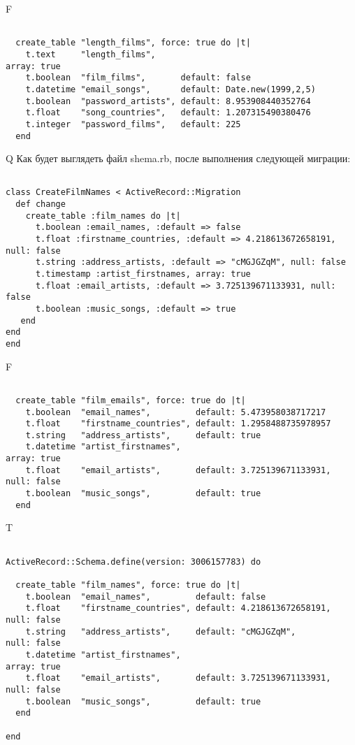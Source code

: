 F
\begin{verbatim}

  create_table "length_films", force: true do |t|
    t.text     "length_films",                                     array: true
    t.boolean  "film_films",       default: false
    t.datetime "email_songs",      default: Date.new(1999,2,5)
    t.boolean  "password_artists", default: 8.953908440352764
    t.float    "song_countries",   default: 1.207315490380476
    t.integer  "password_films",   default: 225
  end

\end{verbatim}

Q
Как будет выглядеть файл shema.rb, после выполнения следующей миграции:

\begin{verbatim}

class CreateFilmNames < ActiveRecord::Migration 
  def change 
    create_table :film_names do |t| 
      t.boolean :email_names, :default => false
      t.float :firstname_countries, :default => 4.218613672658191, null: false
      t.string :address_artists, :default => "cMGJGZqM", null: false
      t.timestamp :artist_firstnames, array: true
      t.float :email_artists, :default => 3.725139671133931, null: false
      t.boolean :music_songs, :default => true
   end
end
end
\end{verbatim}

F
\begin{verbatim}

  create_table "film_emails", force: true do |t|
    t.boolean  "email_names",         default: 5.473958038717217
    t.float    "firstname_countries", default: 1.2958488735978957
    t.string   "address_artists",     default: true
    t.datetime "artist_firstnames",                                            array: true
    t.float    "email_artists",       default: 3.725139671133931, null: false
    t.boolean  "music_songs",         default: true
  end

\end{verbatim}

T
\begin{verbatim}

ActiveRecord::Schema.define(version: 3006157783) do

  create_table "film_names", force: true do |t|
    t.boolean  "email_names",         default: false
    t.float    "firstname_countries", default: 4.218613672658191, null: false
    t.string   "address_artists",     default: "cMGJGZqM",        null: false
    t.datetime "artist_firstnames",                                            array: true
    t.float    "email_artists",       default: 3.725139671133931, null: false
    t.boolean  "music_songs",         default: true
  end

end
\end{verbatim}



